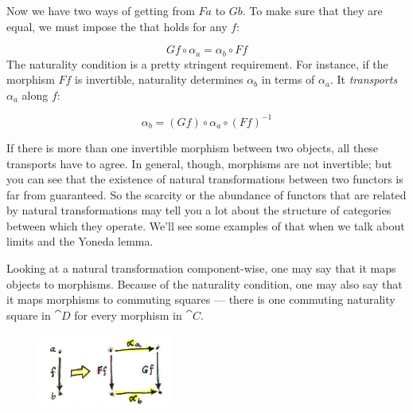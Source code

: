 \noindent
Now we have two ways of getting from $F a$ to $G b$. To
make sure that they are equal, we must impose the  that holds for any $f$:

\[G f \circ \alpha_a = \alpha_b \circ F f\]
The naturality condition is a pretty stringent requirement. For
instance, if the morphism $F f$ is invertible, naturality
determines $\alpha_b$ in terms of $\alpha_a$. It \emph{transports}
$\alpha_a$ along $f$:

\[\alpha_b = (G f) \circ \alpha_a \circ (F f)^{-1}\]

\begin{figure}[H]
\centering
{}
\end{figure}

\noindent
If there is more than one invertible morphism between two objects, all
these transports have to agree. In general, though, morphisms are not
invertible; but you can see that the existence of natural
transformations between two functors is far from guaranteed. So the
scarcity or the abundance of functors that are related by natural
transformations may tell you a lot about the structure of categories
between which they operate. We'll see some examples of that when we talk
about limits and the Yoneda lemma.

Looking at a natural transformation component-wise, one may say that it
maps objects to morphisms. Because of the naturality condition, one may
also say that it maps morphisms to commuting squares --- there is one
commuting naturality square in $\cat{D}$ for every morphism in $\cat{C}$.

\begin{figure}[H]
\centering
\includegraphics[width=0.4\textwidth]{images/naturality.jpg}
\end{figure}

